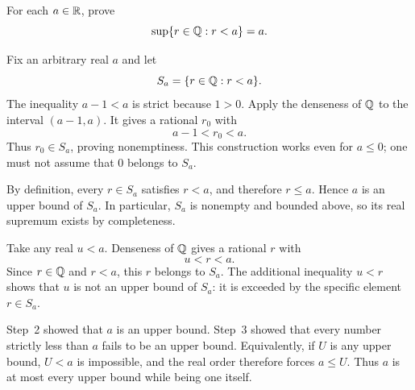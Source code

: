 
\goal For each $a\in\mathbb{R}$, prove
\[
 \sup\{r\in\mathbb{Q}:r<a\}=a.
\]

Fix an arbitrary real $a$ and let
\[
 S_a=\{r\in\mathbb{Q}:r<a\}.
\]
The inequality $a-1<a$ is strict because $1>0$. Apply the denseness
of $\mathbb{Q}$ to the interval $(a-1,a)$. It gives a rational $r_0$ with
\[
 a-1<r_0<a.
\]
Thus $r_0\in S_a$, proving nonemptiness. This construction works
even for $a\le0$; one must not assume that $0$ belongs to $S_a$.

By definition, every $r\in S_a$ satisfies $r<a$, and therefore
$r\le a$. Hence $a$ is an upper bound of $S_a$.
In particular, $S_a$ is nonempty and bounded above, so its real
supremum exists by completeness.

Take any real $u<a$. Denseness of $\mathbb{Q}$ gives a rational $r$ with
\[
 u<r<a.
\]
Since $r\in\mathbb{Q}$ and $r<a$, this $r$ belongs to $S_a$.
The additional inequality $u<r$ shows that $u$ is not an upper bound
of $S_a$: it is exceeded by the specific element $r\in S_a$.

Step~2 showed that $a$ is an upper bound. Step~3 showed that every
number strictly less than $a$ fails to be an upper bound.
Equivalently, if $U$ is any upper bound, $U<a$ is impossible, and
the real order therefore forces $a\le U$.
Thus $a$ is at most every upper bound while being one itself.

